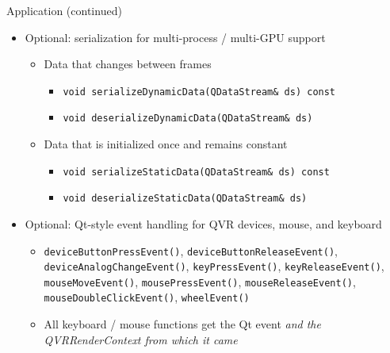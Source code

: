 \documentclass[utf8,stillsansserifmath,fleqn,t]{beamer}
\newcommand{\code}[1]{\texttt{#1}}
\begin{document}
\begin{frame}
\frametitle{\insertsection}
Application (continued)
\begin{itemize}
\item Optional: serialization for multi-process / multi-GPU support\\
    \begin{itemize}
    \item Data that changes between frames
        \begin{itemize}
        \item \code{void serializeDynamicData(QDataStream\& ds) const}
        \item \code{void deserializeDynamicData(QDataStream\& ds)}
        \end{itemize}
    \item Data that is initialized once and remains constant
        \begin{itemize}
        \item \code{void serializeStaticData(QDataStream\& ds) const}
        \item \code{void deserializeStaticData(QDataStream\& ds)}
        \end{itemize}
    \end{itemize}
\item Optional: Qt-style event handling for QVR devices, mouse, and keyboard
    \begin{itemize}
    \item
    \code{deviceButtonPressEvent()}, \code{deviceButtonReleaseEvent()},
    \code{deviceAnalogChangeEvent()},
    \code{keyPressEvent()}, \code{keyReleaseEvent()},
    \code{mouseMoveEvent()}, \code{mousePressEvent()}, \code{mouseReleaseEvent()},
    \code{mouseDoubleClickEvent()}, \code{wheelEvent()}
    \item All keyboard / mouse functions get the Qt event \emph{and the QVRRenderContext from which it
    came}
    \end{itemize}
\end{itemize}
\end{frame}
\end{document}
